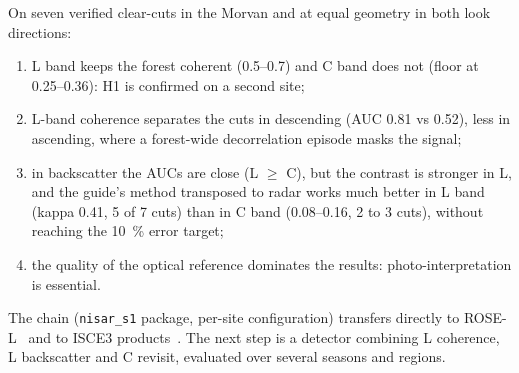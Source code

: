 On seven verified clear-cuts in the Morvan and at equal geometry in both look directions:
\begin{enumerate}
\item L band keeps the forest coherent (0.5--0.7) and C band does not (floor at 0.25--0.36): H1 is confirmed on
  a second site;
\item L-band coherence separates the cuts in descending (AUC 0.81 vs 0.52), less in ascending, where a
  forest-wide decorrelation episode masks the signal;
\item in backscatter the AUCs are close (L $\geq$ C), but the contrast is stronger in L, and the guide's method
  transposed to radar works much better in L band (kappa 0.41, 5 of 7 cuts) than in C band (0.08--0.16, 2 to 3
  cuts), without reaching the 10~\% error target;
\item the quality of the optical reference dominates the results: photo-interpretation is essential.
\end{enumerate}
The chain (\texttt{nisar\_s1} package, per-site configuration) transfers directly to ROSE-L~\cite{esa2020rosel}
and to ISCE3 products~\cite{isce3}. The next step is a detector combining L coherence, L backscatter and C
revisit, evaluated over several seasons and regions.
